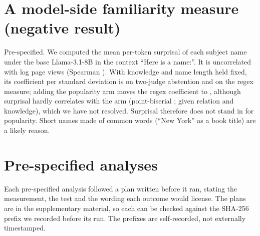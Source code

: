 \documentclass{article}
\begin{document}
\section{A model-side familiarity measure (negative result)}
\label{app:surprisal}

Pre-specified. We computed the mean per-token surprisal of each subject name under the base Llama-3.1-8B in the context ``Here is a name:''. It is uncorrelated with log page views (Spearman \esRho). With knowledge and name length held fixed, its coefficient per standard deviation is \esJudge{} \esJudgeCI{} on two-judge abstention and \esRegex{} \esRegexCI{} on the regex measure; adding the popularity arm moves the regex coefficient to \esRegexPop{} \esRegexPopCI, although surprisal hardly correlates with the arm (point-biserial \esArmR; \esArmPartial{} given relation and knowledge), which we have not resolved. Surprisal therefore does not stand in for popularity. Short names made of common words (``New York'' as a book title) are a likely reason.

\section{Pre-specified analyses}
\label{app:timing}

Each pre-specified analysis followed a plan written before it ran, stating the measurement, the test and the wording each outcome would license. The plans are in the supplementary material, so each can be checked against the SHA-256 prefix we recorded before its run. The prefixes are self-recorded, not externally timestamped.
\end{document}

